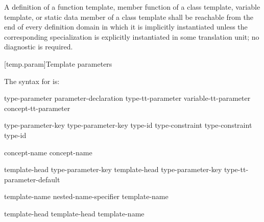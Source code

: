 \pnum
A definition of
a function template,
member function of a class template,
variable template,
or static data member of a class template
shall be reachable from the end of every definition domain
in which it is implicitly instantiated unless the
corresponding specialization is explicitly instantiated
in some translation unit; no diagnostic is required.

[temp.param]{Template parameters}

\pnum
The syntax for
is:

\begin{bnf}
\br
  type-parameter\br
  parameter-declaration\br
  type-tt-parameter\br
  variable-tt-parameter\br
  concept-tt-parameter
\end{bnf}

\begin{bnf}
\br
  type-parameter-key  \br
  type-parameter-key  \terminal{=} type-id\br
  type-constraint  \br
  type-constraint  \terminal{=} type-id
\end{bnf}

\begin{bnf}
\br
  \br
\end{bnf}

\begin{bnf}
\br
   concept-name\br
   concept-name \terminal{<}  \terminal{>}
\end{bnf}

\begin{bnf}
\br
  template-head type-parameter-key  \br
  template-head type-parameter-key  type-tt-parameter-default
\end{bnf}

\begin{bnf}
\br
  \terminal{=}  template-name\br
  \terminal{=} nested-name-specifier  template-name
\end{bnf}

\begin{bnf}
\br
  template-head   \br
  template-head   \terminal{=}  template-name
\end{bnf}

